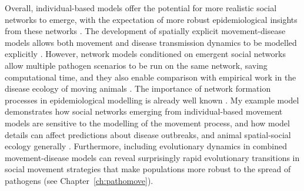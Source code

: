 Overall, individual-based models offer the potential for more realistic social networks to emerge, with the expectation of more robust epidemiological insights from these networks \citep[][]{lunn2021}.
The development of spatially explicit movement-disease models allows both movement and disease transmission dynamics to be modelled explicitly \citep{white2018b,white2018,scherer2020,gupte2022c}.
However, network models conditioned on emergent social networks allow multiple pathogen scenarios to be run on the same network, saving computational time, and they also enable comparison with empirical work in the disease ecology of moving animals \citep{wilber2022}.
The importance of network formation processes in epidemiological modelling is already well known \citep[][]{white2017,wilber2022}.
My example model demonstrates how social networks emerging from individual-based movement models are sensitive to the modelling of the movement process, and how model details can affect predictions about disease outbreaks, and animal spatial-social ecology generally \citep{webber2018,webber2022}.
Furthermore, including evolutionary dynamics in combined movement-disease models can reveal surprisingly rapid evolutionary transitions in social movement strategies that make populations more robust to the spread of pathogens (see Chapter~\ref{ch:pathomove}).

{ \begin{center}  \end{center} }

\endgroup

\clearpage
